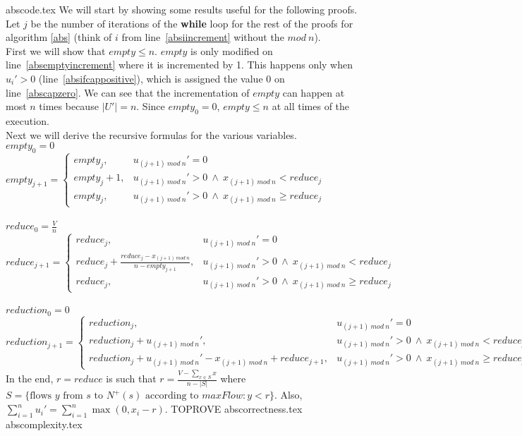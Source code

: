 \documentclass[11pt]{llncs}
\begin{document}
  {abscode.tex}
  \noindent
  We will start by showing some results useful for the following proofs. Let $j$ be the number of iterations of the
  \textbf{while} loop for the rest of the proofs for algorithm \ref{abs} (think of $i$ from line~\ref{absiincrement}
  without the $mod\:n$).\\
  First we will show that $empty \leq n$. $empty$ is only modified on line~\ref{absemptyincrement} where it is
  incremented by 1. This happens only when $u_i' > 0$ (line~\ref{absifcappositive}), which is assigned the value 0 on
  line~\ref{abscapzero}. We can see that the incrementation of $empty$ can happen at most $n$ times because
  $|U'| = n$. Since $empty_0 = 0$, $empty \leq n$ at all times of the execution. \\
  Next we will derive the recursive formulas for the various variables. \\
  $empty_0 = 0$ \\
  $empty_{j+1} = 
     \begin{cases}
        empty_j, & u_{(j+1)\:mod\:n}' = 0 \\
        empty_j+1, & u_{(j+1)\:mod\:n}' > 0 \: \wedge \: x_{(j+1) \:mod\:n} < reduce_j \\
        empty_j, & u_{(j+1)\:mod\:n}' > 0 \: \wedge \: x_{(j+1) \:mod\:n} \geq reduce_j
     \end{cases}$ \\ \ \\
  $reduce_0 = \frac{V}{n}$ \\
  $reduce_{j+1} =
     \begin{cases}
        reduce_j, & u_{(j+1)\:mod\:n}' = 0 \\
        reduce_j + \frac{reduce_j-x_{(j+1)\:mod\:n}}{n-empty_{j+1}}, & u_{(j+1)\:mod\:n}' > 0 \: \wedge \:
           x_{(j+1) \:mod\:n} < reduce_j \\
        reduce_j, & u_{(j+1)\:mod\:n}' > 0 \: \wedge \: x_{(j+1) \:mod\:n} \geq reduce_j
     \end{cases}$ \\ \ \\
  $reduction_0 = 0$ \\
  $reduction_{j+1} =
     \begin{cases}
        reduction_j, & u_{(j+1)\:mod\:n}' = 0 \\
        reduction_j + u_{(j+1)\:mod\:n}', & u_{(j+1)\:mod\:n}' > 0 \: \wedge \: x_{(j+1) \:mod\:n} < reduce_j \\
        reduction_j + u_{(j+1)\:mod\:n}' - x_{(j+1)\:mod\:n} + reduce_{j+1}, &
           u_{(j+1)\:mod\:n}' > 0 \: \wedge \: x_{(j+1) \:mod\:n} \geq reduce_j
     \end{cases}$ \\
  In the end, $r = reduce$ is such that $r = \frac{V - \sum\limits_{x \in S}x}{n - |S|}$ where
  $S = \{\text{flows } y \text{ from } s \text{ to } N^{+}(s) \text{ according to } maxFlow : y < r\}$. Also,
  $\sum\limits_{i=1}^{n}u_i' = \sum\limits_{i=1}^{n}\max{(0,x_i - r)}$. TOPROVE
  {abscorrectness.tex}
  {abscomplexity.tex}
\end{document}

